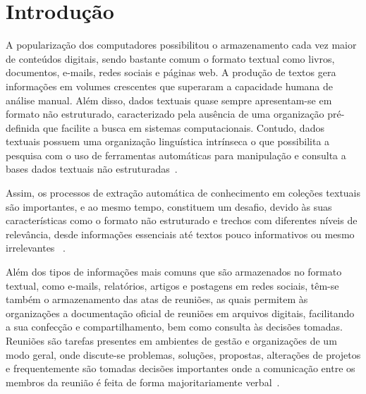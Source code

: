 \chapter{Introdução}\label{cap1}

\let\cleardoublepage\clearpage


A popularização dos computadores possibilitou o armazenamento cada vez maior de conteúdos digitais, sendo bastante comum o formato textual como livros, documentos, e-mails, redes sociais e páginas web. A produção de textos gera informações em volumes crescentes que superaram a capacidade humana de análise manual.  %
%
Além disso, dados textuais quase sempre apresentam-se em formato não estruturado, caracterizado pela ausência de uma organização pré-definida que facilite a busca em sistemas computacionais.
%
Contudo, dados textuais possuem uma organização linguística intrínseca o que possibilita a pesquisa com o uso de ferramentas automáticas para manipulação e consulta a bases dados textuais não estruturadas~\cite{Cao:2017, Manning2008}. 



Assim, os processos de extração automática de conhecimento em coleções textuais são importantes, e ao mesmo tempo, constituem um desafio, devido às suas características como o formato não estruturado e trechos com diferentes níveis de relevância, desde informações essenciais até textos pouco informativos ou mesmo irrelevantes~
\cite{Aggarwal2012, Jeong:2010, Tagarelli2013}. 

Além dos tipos de informações mais comuns que são armazenados no formato textual, como e-mails, relatórios, artigos e postagens em redes sociais, têm-se também o armazenamento das atas de reuniões, as quais permitem às organizações a documentação oficial de reuniões em arquivos digitais, facilitando a sua confecção e compartilhamento, bem como consulta às decisões tomadas.
% 
% 
% 
Reuniões são tarefas presentes em ambientes de gestão e organizações de um modo geral, onde discute-se problemas, soluções, propostas, alterações de projetos e frequentemente são tomadas decisões importantes onde a comunicação entre os membros da reunião é feita de forma majoritariamente verbal~\cite{Bokaei2016, Miriam2013}. 

